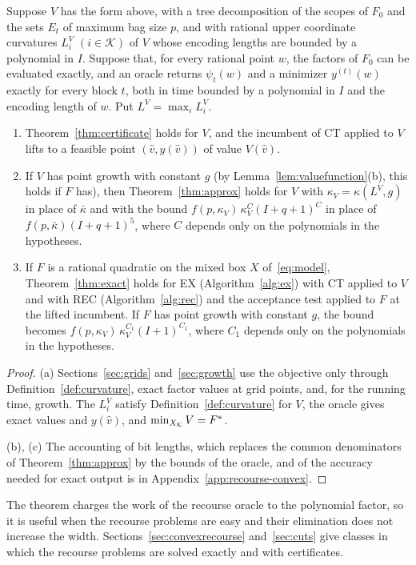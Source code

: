 \begin{theorem}\label{thm:valuefn}
Suppose $V$ has the form above, with a tree decomposition of the scopes of
$F_0$ and the sets $E_t$ of maximum bag size $p$, and with rational upper
coordinate curvatures $L_i^V$ $(i\in\mathcal K)$ of $V$ whose encoding
lengths are bounded by a polynomial in $I$. Suppose that, for every rational
point $w$, the factors of $F_0$ can be evaluated exactly, and an oracle
returns $\psi_t(w)$ and a minimizer $y^{(t)}(w)$ exactly for every block $t$,
both in time bounded by a polynomial in $I$ and the encoding length of $w$.
Put $L^V=\max_iL_i^V$.
\begin{enumerate}[label=(\alph*)]
\item Theorem~\ref{thm:certificate} holds for $V$, and the incumbent of CT
applied to $V$ lifts to a feasible point $(\hat v,y(\hat v))$ of value
$V(\hat v)$.
\item If $V$ has point growth with constant $g$ (by
Lemma~\ref{lem:valuefunction}(b), this holds if $F$ has), then
Theorem~\ref{thm:approx} holds for $V$ with $\kappa_V=\kappa(L^V,g)$ in
place of $\bar\kappa$ and with the bound
$f(p,\kappa_V)\,\kappa_V^{C}(I+q+1)^{C}$ in place of
$f(p,\bar\kappa)(I+q+1)^5$, where $C$ depends only on the polynomials in
the hypotheses.
\item If $F$ is a rational quadratic on the mixed box $X$
of~\eqref{eq:model}, Theorem~\ref{thm:exact} holds for EX
(Algorithm~\ref{alg:ex}) with CT applied to $V$ and with REC
(Algorithm~\ref{alg:rec}) and the acceptance test applied to $F$ at the
lifted incumbent. If $F$ has point
growth with constant $g$, the bound becomes
$f(p,\kappa_V)\,\kappa_V^{C_1}(I+1)^{C_1}$, where $C_1$ depends only on the
polynomials in the hypotheses.
\end{enumerate}
\end{theorem}

\begin{proof}
(a) Sections~\ref{sec:grids} and~\ref{sec:growth} use the objective only
through Definition~\ref{def:curvature}, exact factor values at grid points,
and, for the running time, growth. The $L_i^V$ satisfy
Definition~\ref{def:curvature} for $V$, the oracle gives exact values and
$y(\hat v)$, and $\min_{X_{\mathcal K}}V=F^{*}$.

(b), (c) The accounting of bit lengths, which replaces the common
denominators of Theorem~\ref{thm:approx} by the bounds of the oracle, and of
the accuracy needed for exact output is in
Appendix~\ref{app:recourse-convex}.
\end{proof}

The theorem charges the work of the recourse oracle to the polynomial
factor, so it is useful when the recourse problems are easy and their
elimination does not increase the width. Sections~\ref{sec:convexrecourse}
and~\ref{sec:cuts} give classes in which the recourse problems are solved
exactly and with certificates.
